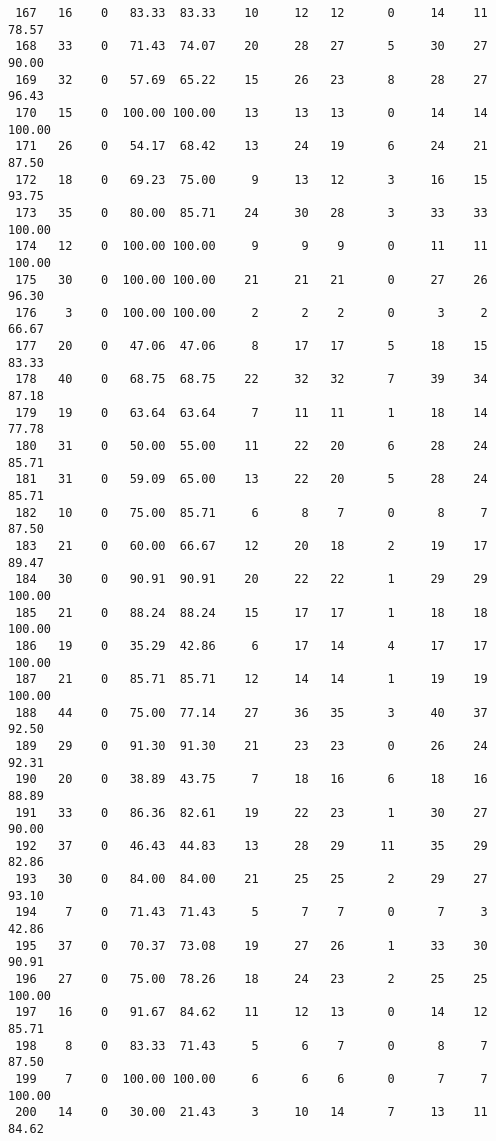 \begin{verbatim}
 167   16    0   83.33  83.33    10     12   12      0     14    11    78.57
 168   33    0   71.43  74.07    20     28   27      5     30    27    90.00
 169   32    0   57.69  65.22    15     26   23      8     28    27    96.43
 170   15    0  100.00 100.00    13     13   13      0     14    14   100.00
 171   26    0   54.17  68.42    13     24   19      6     24    21    87.50
 172   18    0   69.23  75.00     9     13   12      3     16    15    93.75
 173   35    0   80.00  85.71    24     30   28      3     33    33   100.00
 174   12    0  100.00 100.00     9      9    9      0     11    11   100.00
 175   30    0  100.00 100.00    21     21   21      0     27    26    96.30
 176    3    0  100.00 100.00     2      2    2      0      3     2    66.67
 177   20    0   47.06  47.06     8     17   17      5     18    15    83.33
 178   40    0   68.75  68.75    22     32   32      7     39    34    87.18
 179   19    0   63.64  63.64     7     11   11      1     18    14    77.78
 180   31    0   50.00  55.00    11     22   20      6     28    24    85.71
 181   31    0   59.09  65.00    13     22   20      5     28    24    85.71
 182   10    0   75.00  85.71     6      8    7      0      8     7    87.50
 183   21    0   60.00  66.67    12     20   18      2     19    17    89.47
 184   30    0   90.91  90.91    20     22   22      1     29    29   100.00
 185   21    0   88.24  88.24    15     17   17      1     18    18   100.00
 186   19    0   35.29  42.86     6     17   14      4     17    17   100.00
 187   21    0   85.71  85.71    12     14   14      1     19    19   100.00
 188   44    0   75.00  77.14    27     36   35      3     40    37    92.50
 189   29    0   91.30  91.30    21     23   23      0     26    24    92.31
 190   20    0   38.89  43.75     7     18   16      6     18    16    88.89
 191   33    0   86.36  82.61    19     22   23      1     30    27    90.00
 192   37    0   46.43  44.83    13     28   29     11     35    29    82.86
 193   30    0   84.00  84.00    21     25   25      2     29    27    93.10
 194    7    0   71.43  71.43     5      7    7      0      7     3    42.86
 195   37    0   70.37  73.08    19     27   26      1     33    30    90.91
 196   27    0   75.00  78.26    18     24   23      2     25    25   100.00
 197   16    0   91.67  84.62    11     12   13      0     14    12    85.71
 198    8    0   83.33  71.43     5      6    7      0      8     7    87.50
 199    7    0  100.00 100.00     6      6    6      0      7     7   100.00
 200   14    0   30.00  21.43     3     10   14      7     13    11    84.62

\end{verbatim}
